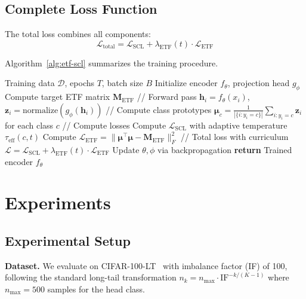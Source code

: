 \documentclass{article}
\begin{document}
\subsection{Complete Loss Function}

The total loss combines all components:
\begin{equation}
\mathcal{L}_{\text{total}} = \mathcal{L}_{\text{SCL}} + \lambda_{\text{ETF}}(t) \cdot \mathcal{L}_{\text{ETF}}
\end{equation}

Algorithm~\ref{alg:etf-scl} summarizes the training procedure.

\begin{algorithm}[t]
\caption{ETF-SCL Training}
\label{alg:etf-scl}
\begin{algorithmic}
\REQUIRE Training data $\mathcal{D}$, epochs $T$, batch size $B$
\STATE Initialize encoder $f_\theta$, projection head $g_\phi$
\STATE Compute target ETF matrix $\mathbf{M}_{\text{ETF}}$
        \STATE // Forward pass
        \STATE $\mathbf{h}_i = f_\theta(x_i)$, $\mathbf{z}_i = \text{normalize}(g_\phi(\mathbf{h}_i))$
        \STATE // Compute class prototypes
        \STATE $\boldsymbol{\mu}_c = \frac{1}{|\{i: y_i = c\}|} \sum_{i: y_i = c} \mathbf{z}_i$ for each class $c$
        \STATE // Compute losses
        \STATE Compute $\mathcal{L}_{\text{SCL}}$ with adaptive temperature $\tau_{\text{eff}}(c, t)$
        \STATE Compute $\mathcal{L}_{\text{ETF}} = \| \boldsymbol{\mu}^\top \boldsymbol{\mu} - \mathbf{M}_{\text{ETF}} \|_F^2$
        \STATE // Total loss with curriculum
        \STATE $\mathcal{L} = \mathcal{L}_{\text{SCL}} + \lambda_{\text{ETF}}(t) \cdot \mathcal{L}_{\text{ETF}}$
        \STATE Update $\theta, \phi$ via backpropagation
    \ENDFOR
\ENDFOR
\STATE \textbf{return} Trained encoder $f_\theta$
\end{algorithmic}
\end{algorithm}

\section{Experiments}

\subsection{Experimental Setup}

\textbf{Dataset.} We evaluate on CIFAR-100-LT~
\citep{krizhevsky2009learning} with imbalance factor (IF) of 100, following the standard long-tail transformation $n_k = n_{\text{max}} \cdot \text{IF}^{-k/(K-1)}$ where $n_{\text{max}} = 500$ samples for the head class.
\end{document}
